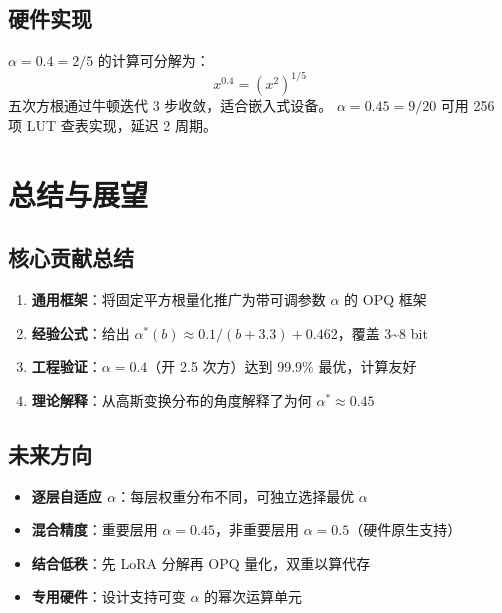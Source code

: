 \documentclass[11pt,a4paper]{article}
\begin{document}
\subsection{硬件实现}

$\alpha = 0.4 = 2/5$ 的计算可分解为：
$$x^{0.4} = (x^2)^{1/5}$$
五次方根通过牛顿迭代 3 步收敛，适合嵌入式设备。
$\alpha = 0.45 = 9/20$ 可用 256 项 LUT 查表实现，延迟 2 周期。

\section{总结与展望}

\subsection{核心贡献总结}

\begin{enumerate}
\item \textbf{通用框架}：将固定平方根量化推广为带可调参数 $\alpha$ 的 OPQ 框架
\item \textbf{经验公式}：给出 $\alpha^*(b) \approx 0.1/(b+3.3) + 0.462$，覆盖 3\~{}8 bit
\item \textbf{工程验证}：$\alpha = 0.4$（开 2.5 次方）达到 99.9\% 最优，计算友好
\item \textbf{理论解释}：从高斯变换分布的角度解释了为何 $\alpha^* \approx 0.45$
\end{enumerate}

\subsection{未来方向}

\begin{itemize}
\item \textbf{逐层自适应 $\alpha$}：每层权重分布不同，可独立选择最优 $\alpha$
\item \textbf{混合精度}：重要层用 $\alpha=0.45$，非重要层用 $\alpha=0.5$（硬件原生支持）
\item \textbf{结合低秩}：先 LoRA 分解再 OPQ 量化，双重以算代存
\item \textbf{专用硬件}：设计支持可变 $\alpha$ 的幂次运算单元
\end{itemize}

\appendix
\end{document}
